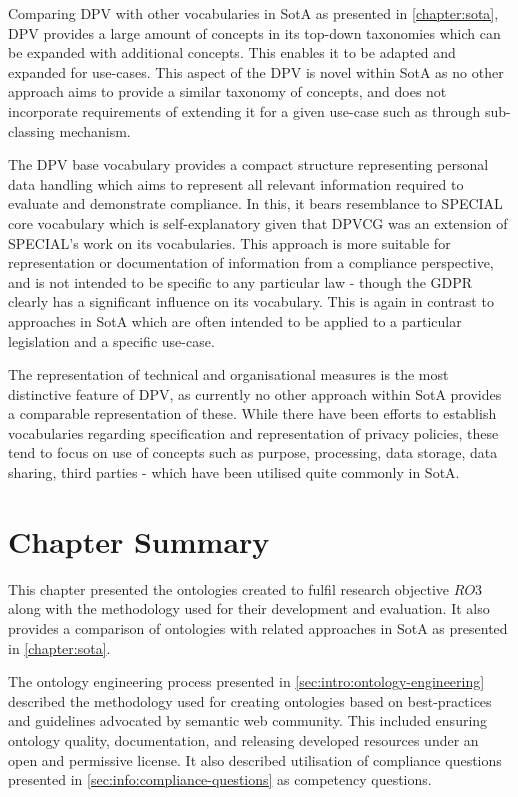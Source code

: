 Comparing DPV with other vocabularies in SotA as presented in \autoref{chapter:sota}, DPV provides a large amount of concepts in its top-down taxonomies which can be expanded with additional concepts. This enables it to be adapted and expanded for use-cases.
This aspect of the DPV is novel within SotA as no other approach aims to provide a similar taxonomy of concepts, and does not incorporate requirements of extending it for a given use-case such as through sub-classing mechanism.

The DPV base vocabulary provides a compact structure representing personal data handling which aims to represent all relevant information required to evaluate and demonstrate compliance.
In this, it bears resemblance to SPECIAL core vocabulary \cite{bonatti_special_2018-2} which is self-explanatory given that DPVCG was an extension of SPECIAL's work on its vocabularies.
This approach is more suitable for representation or documentation of information from a compliance perspective, and is not intended to be specific to any particular law - though the GDPR clearly has a significant influence on its vocabulary.
This is again in contrast to approaches in SotA which are often intended to be applied to a particular legislation and a specific use-case.

The representation of technical and organisational measures is the most distinctive feature of DPV, as currently no other approach within SotA provides a comparable representation of these.
While there have been efforts to establish vocabularies regarding specification and representation of privacy policies, these tend to focus on use of concepts such as purpose, processing, data storage, data sharing, third parties - which have been utilised quite commonly in SotA.

\section*{Chapter Summary}
This chapter presented the ontologies created to fulfil research objective $RO3$ along with the methodology used for their development and evaluation. It also provides a comparison of ontologies with related approaches in SotA as presented in \autoref{chapter:sota}.

The ontology engineering process presented in \autoref{sec:intro:ontology-engineering} described the methodology used for creating ontologies based on best-practices and guidelines advocated by semantic web community. This included ensuring ontology quality, documentation, and releasing developed resources under an open and permissive license.
It also described utilisation of compliance questions presented in \autoref{sec:info:compliance-questions} as competency questions.

